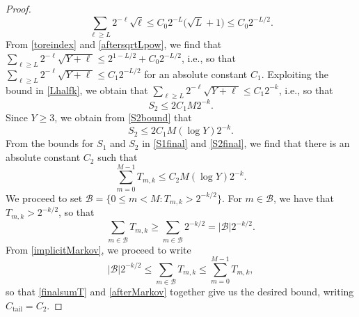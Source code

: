 \documentclass[10pt,a4paper]{amsart}
\begin{document}
\begin{proof}
\begin{equation}\label{aftersqrtLpow}
 \sum_{\ell \geq L} 2^{-\ell} \sqrt{\ell} 
 \leq C_0 2^{-L} \big( \sqrt{L} + 1 \big) \leq C_{0} 2^{-L/2}. 
\end{equation}
 From \eqref{toreindex} and \eqref{aftersqrtLpow}, we find that 
 $ \sum_{\ell \geq L} 2^{-\ell} \sqrt{Y + \ell} \leq 2^{1 - L/2} + C_{0} 2^{-L/2}$, i.e., so that $ \sum_{\ell \geq L} 2^{-\ell} \sqrt{Y + \ell} 
 \leq C_{1} 2^{-L/2} $ for an absolute constant $C_{1}$. Exploiting the bound in \eqref{Lhalfk}, we obtain that $ \sum_{\ell \geq L} 
 2^{-\ell} \sqrt{Y + \ell} \leq C_{1} 2^{-k}$, i.e., so that 
\begin{equation}\label{S2bound} 
 S_{2} \leq 2 C_{1} M 2^{-k}. 
\end{equation}
 Since $Y \geq 3$, we obtain from \eqref{S2bound} that 
\begin{equation}\label{S2final} 
 S_2 \leq 2 C_1 M (\log Y) 2^{-k}. 
\end{equation}
 From the bounds for $S_1$ and $S_2$ in \eqref{S1final} and \eqref{S2final}, we find that there is an absolute constant $C_{2}$ such that 
\begin{equation}\label{finalsumT} 
 \sum_{m=0}^{M-1} T_{m, k} \leq C_{2} M (\log Y) 2^{-k}. 
\end{equation}
 We proceed to set
 $ \mathcal{B} = \big\{ 0 \leq m < M : T_{m, k} > 2^{-k/2} \big\}$. 
 For $m \in \mathcal{B}$, we have that $T_{m, k} > 2^{-k/2}$, so that 
\begin{equation}\label{implicitMarkov} 
 \sum_{m \in \mathcal{B}} T_{m, k} \geq \sum_{m \in \mathcal{B}} 2^{-k/2} = | \mathcal{B} | 2^{-k/2}. 
\end{equation}
 From \eqref{implicitMarkov}, we proceed to write
\begin{equation}\label{afterMarkov}
 |\mathcal{B}| 2^{-k/2} \leq \sum_{m \in \mathcal{B}} T_{m, k} \leq \sum_{m=0}^{M-1} T_{m, k}, 
\end{equation}
 so that \eqref{finalsumT} and \eqref{afterMarkov} together give us the desired bound, 
 writing $C_{\operatorname{tail}} = C_{2}$. 
\end{proof}
\end{document}
